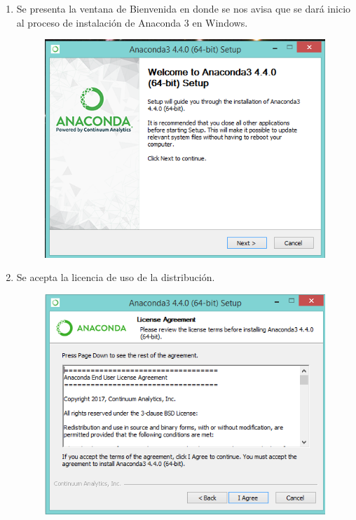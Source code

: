 \documentclass[12pt]{article}
\begin{document}
\begin{enumerate}
\begin{figure}[H]
\end{figure}
\item Se presenta la ventana de Bienvenida en donde se nos avisa que se dará inicio al proceso de instalación de Anaconda 3 en  Windows.
\begin{figure}[H]
	\centering
	\includegraphics[scale=0.5]{Imagenes/Instalacion_Anaconda_Windows_03} 
\end{figure}
\item Se acepta la licencia de uso de la distribución.
\begin{figure}[H]
	\centering
	\includegraphics[scale=0.5]{Imagenes/Instalacion_Anaconda_Windows_04} 
\end{figure}

\end{enumerate}
\end{document}

